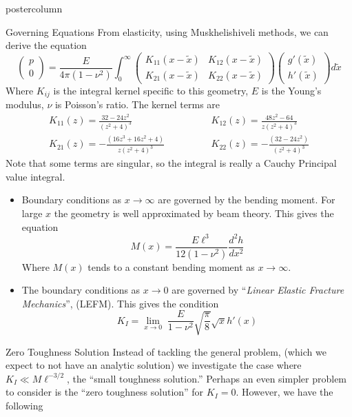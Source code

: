 \documentclass{beamer}
\begin{document}
\begin{frame}
\begin{columns}
\begin{column}{.43\textwidth}
\begin{beamercolorbox}[center]{postercolumn}
\begin{minipage}{.98\textwidth}
{\begin{myblock}{Governing Equations}
From elasticity, using Muskhelishiveli methods, we can derive the equation
\[
\left( \begin{array}{c} p \\ 0 \end{array} \right)   =
\frac{E}{4\pi (1-\nu^2)} \int_0^{\infty}
\left(\begin{array}{cc} K_{11}(x-\tilde{x}) & K_{12}(x-\tilde{x}) \\ 
K_{21}(x-\tilde{x}) & K_{22}(x-\tilde{x}) \end{array} \right)
\left( \begin{array}{c} g'(\tilde{x}) \\ h'(\tilde{x}) \end{array} 
\right)d\tilde{x}  \]
Where $K_{ij}$ is the integral kernel specific to this geometry, $E$ is the
Young's modulus, $\nu$ is Poisson's ratio. The kernel terms are
\[ \begin{array}{lcl}
\displaystyle K_{11}(z) = \frac{32-24z^2}{(z^2+4)^3} & ~\hspace{2pt} &
\displaystyle K_{12}(z) = \frac{48z^2-64}{z(z^2+4)^3} \\[19pt]
\displaystyle K_{21}(z) = -\frac{(16z^3+16z^2+4)}{z(z^2+4)^3} & ~\quad\qquad &
\displaystyle K_{22}(z) = -\frac{(32-24z^2)}{(z^2+4)^3} 
\end{array} \] 
Note that some terms are singular, so the integral is really a Cauchy Principal
value integral.
\begin{itemize}
\item Boundary conditions as $x\to\infty$ are governed by the bending moment.
      For large $x$ the geometry is well approximated by beam theory. This 
      gives the equation 
      \[ M(x) = \frac{E\ell^3}{12(1-\nu^2)}\frac{d^2h}{dx^2} \]
      Where $M(x)$ tends to a constant bending moment as $x\to \infty$.
\item The boundary conditions as $x\to0$ are governed by ``\emph{Linear Elastic
      Fracture Mechanics}'', (LEFM). This gives the condition
      \[K_I = \lim_{x\to 0} \; \frac{E}{1-\nu^2}\sqrt{\frac{\pi}{8}} \sqrt{x}
      h'(x) \]
\end{itemize}
\end{myblock}\vfill
\begin{myblock}{Zero Toughness Solution}
Instead of tackling the general problem, (which we expect to not have an
analytic solution) we investigate the case where $K_I \ll M \ell^{-3/2}$,
the ``small toughness solution.'' Perhaps an even simpler problem to consider
is the ``zero toughness solution'' for $K_I=0$. However, we have the following

\end{myblock}}
\end{minipage}
\end{beamercolorbox}
\end{column}
\end{columns}
\end{frame}
\end{document}
